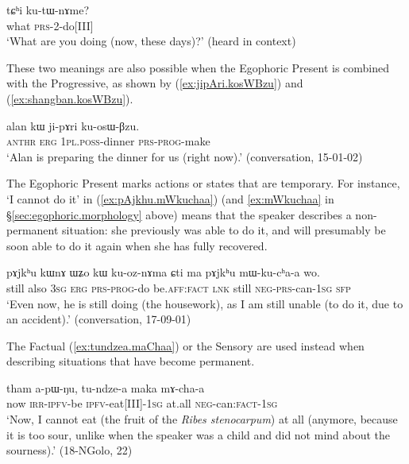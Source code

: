 \begin{exe}
\ex \label{ex:tChi.kutWnAme}
\gll tɕʰi ku-tɯ-nɤme? \\
what \textsc{prs}-2-do[III] \\
\glt `What are you doing (now, these days)?' (heard in context)
\end{exe}

These two meanings are also possible when the Egophoric Present is combined with the Progressive, as shown by (\ref{ex:jipAri.kosWBzu}) and (\ref{ex:shangban.kosWBzu}).

\begin{exe}
\ex \label{ex:jipAri.kosWBzu}
\gll alan kɯ ji-pɤri ku-osɯ-βzu. \\
\textsc{anthr} \textsc{erg} \textsc{1pl}.\textsc{poss}-dinner \textsc{prs}-\textsc{prog}-make \\
\glt `Alan is preparing the dinner for us (right now).' (conversation, 15-01-02)
\end{exe}

The Egophoric Present marks actions or states that are temporary. For instance,  `I cannot do it' in (\ref{ex:pAjkhu.mWkuchaa}) (and \ref{ex:mWkuchaa} in §\ref{sec:egophoric.morphology} above) means that the speaker describes a non-permanent situation: she previously was able to do it, and will presumably be soon able to do it again when she has fully recovered.

\begin{exe}
\ex \label{ex:pAjkhu.mWkuchaa}
\gll pɤjkʰu kɯnɤ ɯʑo kɯ ku-oz-nɤma ɕti ma pɤjkʰu mɯ-ku-cʰa-a wo. \\
still also \textsc{3sg} \textsc{erg} \textsc{prs}-\textsc{prog}-do be.\textsc{aff}:\textsc{fact} \textsc{lnk} still \textsc{neg}-\textsc{prs}-can-\textsc{1sg} \textsc{sfp} \\
\glt `Even now, he is still doing (the housework), as I am still unable (to do it, due to an accident).' (conversation, 17-09-01)
\end{exe}

The Factual (\ref{ex:tundzea.maChaa}) or the Sensory are used instead when describing situations that have become permanent.

\begin{exe}
\ex \label{ex:tundzea.maChaa}
\gll  tham a-pɯ-ŋu, tu-ndze-a maka mɤ-cha-a \\
now \textsc{irr}-\textsc{ipfv}-be \textsc{ipfv}-eat[III]-\textsc{1sg} at.all \textsc{neg}-can:\textsc{fact}-\textsc{1sg} \\
\glt `Now, I cannot eat (the fruit of the \textit{Ribes stenocarpum}) at all (anymore, because it is too sour, unlike when the speaker was a child and did not mind about the sourness).' (18-NGolo, 22)
\end{exe}

